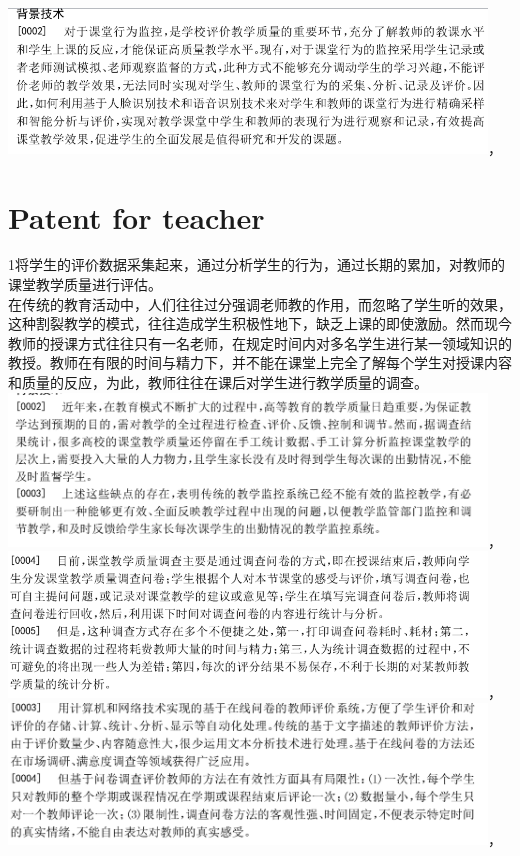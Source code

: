 \documentclass[]{article}
\begin{document}
\begin{CJK}{UTF8}{}
\includegraphics[width=5in]{pic4}，\\
\section{Patent for teacher}
1将学生的评价数据采集起来，通过分析学生的行为，通过长期的累加，对教师的课堂教学质量进行评估。\\
在传统的教育活动中，人们往往过分强调老师教的作用，而忽略了学生听的效果，这种割裂教学的模式，往往造成学生积极性地下，缺乏上课的即使激励。然而现今教师的授课方式往往只有一名老师，在规定时间内对多名学生进行某一领域知识的教授。教师在有限的时间与精力下，并不能在课堂上完全了解每个学生对授课内容和质量的反应，为此，教师往往在课后对学生进行教学质量的调查。\\
\includegraphics[width=5in]{pic9}，\\
\includegraphics[width=5in]{pic5}，\\
\includegraphics[width=5in]{pic6}，\\

\end{CJK}
\end{document}

